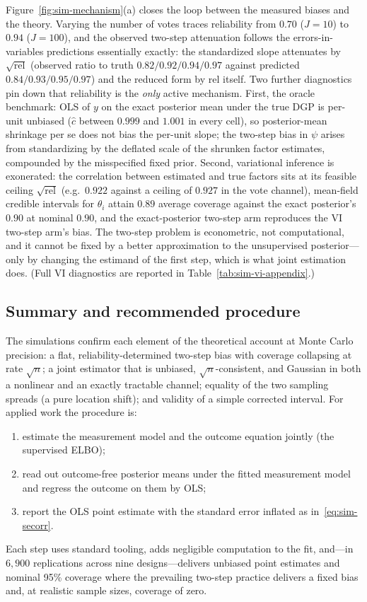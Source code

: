 Figure~\ref{fig:sim-mechanism}(a) closes the loop between the measured
biases and the theory.  Varying the number of votes traces reliability from
$0.70$ ($J=10$) to $0.94$ ($J=100$), and the observed two-step attenuation
follows the errors-in-variables predictions essentially exactly: the
standardized slope attenuates by $\sqrt{\mathrm{rel}}$ (observed ratio to
truth $0.82/0.92/0.94/0.97$ against predicted $0.84/0.93/0.95/0.97$) and
the reduced form by $\mathrm{rel}$ itself.  Two further diagnostics pin
down that reliability is the \emph{only} active mechanism.  First, the
oracle benchmark: OLS of $y$ on the exact posterior mean under the true DGP
is per-unit unbiased ($\hat c$ between $0.999$ and $1.001$ in every cell),
so posterior-mean shrinkage per se does not bias the per-unit slope; the
two-step bias in $\psi$ arises from standardizing by the deflated scale of
the shrunken factor estimates, compounded by the misspecified fixed prior.
Second, variational inference is exonerated: the correlation between
estimated and true factors sits at its feasible ceiling
$\sqrt{\mathrm{rel}}$ (e.g.\ $0.922$ against a ceiling of $0.927$ in the
vote channel), mean-field credible intervals for $\theta_i$ attain $0.89$
average coverage against the exact posterior's $0.90$ at nominal $0.90$,
and the exact-posterior two-step arm reproduces the VI two-step arm's bias.
The two-step problem is econometric, not computational, and it cannot be
fixed by a better approximation to the unsupervised posterior---only by
changing the estimand of the first step, which is what joint estimation
does.  (Full VI diagnostics are reported in
Table~\ref{tab:sim-vi-appendix}.)

\subsection{Summary and recommended procedure}
\label{sec:sim-recipe}

The simulations confirm each element of the theoretical account at Monte
Carlo precision: a flat, reliability-determined two-step bias with coverage
collapsing at rate $\sqrt{n}$; a joint estimator that is unbiased,
$\sqrt{n}$-consistent, and Gaussian in both a nonlinear and an exactly
tractable channel; equality of the two sampling spreads (a pure location
shift); and validity of a simple corrected interval.  For applied work the
procedure is:
\begin{enumerate}
\item estimate the measurement model and the outcome equation jointly
  (the supervised ELBO);
\item read out outcome-free posterior means under the fitted measurement
  model and regress the outcome on them by OLS;
\item report the OLS point estimate with the standard error
  inflated as in~\eqref{eq:sim-secorr}.
\end{enumerate}
Each step uses standard tooling, adds negligible computation to the fit,
and---in $6{,}900$ replications across nine designs---delivers unbiased
point estimates and nominal 95\% coverage where the prevailing two-step
practice delivers a fixed bias and, at realistic sample sizes, coverage
of zero.

